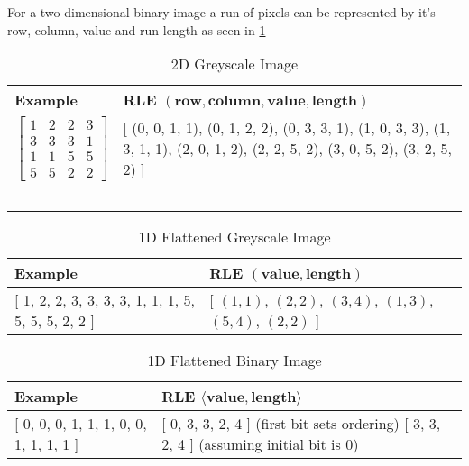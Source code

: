 For a two dimensional binary image a run of pixels can be represented by it's row, column, value and run length \parencite[p. 27-28]{burger2009principles} as seen in \cref{table:rle-2d}

\begin{table}[h]

    \begin{tabularx}{\textwidth}{ X | X }
        \toprule
        Example & RLE $(\textbf{row}, \textbf{column}, \textbf{value}, \textbf{length})$\\
        \midrule

        $$\begin{bmatrix}
        1 & 2 & 2 & 3  \\
        3 & 3 & 3 & 1  \\
        1 & 1 & 5 & 5  \\
        5 & 5 & 2 & 2
        \end{bmatrix}$$

        &
        {[} (0, 0, 1, 1), (0, 1, 2, 2), (0, 3, 3, 1), \newline
        (1, 0, 3, 3), (1, 3, 1, 1), (2, 0, 1, 2), \newline
        (2, 2, 5, 2), (3, 0, 5, 2), (3, 2, 5, 2) {]} \\
        \ & \ \\
    \bottomrule
    \end{tabularx}

    \label{table:rle-2d}
    \caption{2D Greyscale Image}
\end{table}


\begin{table}[h]
    \begin{tabularx}{\textwidth}{ X | X }
        \toprule
        Example & RLE $(\textbf{value}, \textbf{length})$\\
        \midrule

        {[} 1, 2, 2, 3, 3, 3, 3, 1, 1, 1, 5, 5, 5, 5, 2, 2 {]}
        &
        {[} $(1, 1)$,
        $(2, 2)$,
        $(3, 4)$,
        $(1, 3)$,
        $(5, 4)$,
        $(2, 2)$ {]} \\
    \bottomrule
    \end{tabularx}

    \label{table:rle-1d}
    \caption{1D Flattened Greyscale Image}
\end{table}

\begin{table}[h]
    \begin{tabularx}{\textwidth}{ X | X }
        \toprule
        Example & RLE $\langle \textbf{value}, \textbf{length} \rangle$\\
        \midrule

        {[} 0, 0, 0, 1, 1, 1, 0, 0, 1, 1, 1, 1 {]}
        &
        {[} 0, 3, 3, 2, 4 {]} (first bit sets ordering)\newline
        {[} 3, 3, 2, 4 {]} (assuming initial bit is 0) \\
    \bottomrule
    \end{tabularx}

    \label{table:rle-1d-binary}
    \caption{1D Flattened Binary Image}
\end{table}

